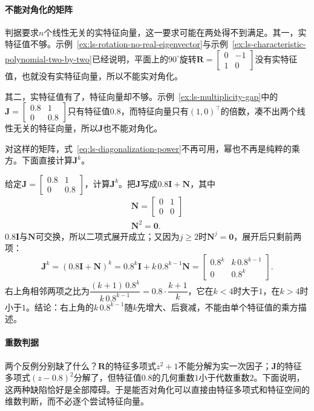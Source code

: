 \paragraph{不能对角化的矩阵}
判据要求$n$个线性无关的实特征向量，这一要求可能在两处得不到满足。其一，实特征值不够。示例~\ref{ex:ls-rotation-no-real-eigenvector}与示例~\ref{ex:ls-characteristic-polynomial-two-by-two}已经说明，平面上的$90^\circ$旋转$\bm R=\left[\begin{smallmatrix}0&-1\\1&0\end{smallmatrix}\right]$没有实特征值，也就没有实特征向量，所以不能实对角化。

其二，实特征值有了，特征向量却不够。示例~\ref{ex:ls-multiplicity-gap}中的$\bm J=\left[\begin{smallmatrix}0.8&1\\0&0.8\end{smallmatrix}\right]$只有特征值$0.8$，而特征向量只有$(1,0)^{\top}$的倍数，凑不出两个线性无关的特征向量，所以$\bm J$也不能对角化。

对这样的矩阵，式~\eqref{eq:ls-diagonalization-power}不再可用，幂也不再是纯粹的乘方。下面直接计算$\bm J^k$。
\begin{example}[不能对角化矩阵的幂]
\label{ex:ls-jordan-block-power}
给定$\bm J=\left[\begin{smallmatrix}0.8&1\\0&0.8\end{smallmatrix}\right]$，计算$\bm J^k$。把$\bm J$写成$0.8\bm I+\bm N$，其中
\[
\begin{gathered}
\bm N=\begin{bmatrix}0&1\\0&0\end{bmatrix}\\
\bm N^2=\bm0 .
\end{gathered}
\]
$0.8\bm I$与$\bm N$可交换，所以二项式展开成立；又因为$j\geq2$时$\bm N^j=\bm0$，展开后只剩前两项：
\[
 \bm J^k=(0.8\bm I+\bm N)^k=0.8^k\bm I+k\,0.8^{k-1}\bm N=\begin{bmatrix}0.8^k&k\,0.8^{k-1}\\0&0.8^k\end{bmatrix}.
\]
右上角相邻两项之比为$\dfrac{(k+1)\,0.8^{k}}{k\,0.8^{k-1}}=0.8\cdot\dfrac{k+1}{k}$，它在$k<4$时大于$1$，在$k>4$时小于$1$。结论：右上角的$k\,0.8^{k-1}$随$k$先增大、后衰减，不能由单个特征值的乘方描述。
\end{example}

\paragraph{重数判据}
两个反例分别缺了什么？$\bm R$的特征多项式$z^2+1$不能分解为实一次因子；$\bm J$的特征多项式$(z-0.8)^2$分解了，但特征值$0.8$的几何重数$1$小于代数重数$2$。下面说明，这两种缺陷恰好是全部障碍。于是能否对角化可以直接由特征多项式和特征空间的维数判断，而不必逐个尝试特征向量。

